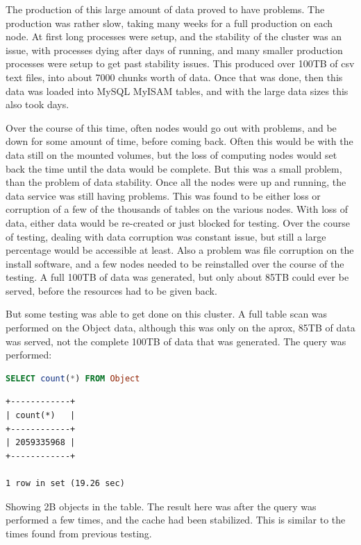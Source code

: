 \documentclass[DM,lsstdraft,toc]{lsstdoc}
\begin{document}
The production of this large amount of data proved to have problems. The
production was rather slow, taking many weeks for a full production on
each node. At first long processes were setup, and the stability of the
cluster was an issue, with processes dying after days of running, and
many smaller production processes were setup to get past stability
issues. This produced over 100TB of csv text files, into about 7000
chunks worth of data. Once that was done, then this data was loaded into
MySQL MyISAM tables, and with the large data sizes this also took days.

Over the course of this time, often nodes would go out with problems,
and be down for some amount of time, before coming back. Often this
would be with the data still on the mounted volumes, but the loss of
computing nodes would set back the time until the data would be
complete. But this was a small problem, than the problem of data
stability. Once all the nodes were up and running, the data service was
still having problems. This was found to be either loss or corruption of
a few of the thousands of tables on the various nodes. With loss of
data, either data would be re-created or just blocked for testing. Over
the course of testing, dealing with data corruption was constant issue,
but still a large percentage would be accessible at least. Also a
problem was file corruption on the install software, and a few nodes
needed to be reinstalled over the course of the testing. A full 100TB of
data was generated, but only about 85TB could ever be served, before the
resources had to be given back.

But some testing was able to get done on this cluster. A full table scan
was performed on the Object data, although this was only on the aprox,
85TB of data was served, not the complete 100TB of data that was
generated. The query was performed:

\begin{lstlisting}[language=SQL]
SELECT count(*) FROM Object
\end{lstlisting}

\begin{verbatim}
+------------+
| count(*)   |
+------------+
| 2059335968 |
+------------+

1 row in set (19.26 sec)
\end{verbatim}

Showing 2B objects in the table. The result here was after the query was
performed a few times, and the cache had been stabilized. This is
similar to the times found from previous testing.
\end{document}
